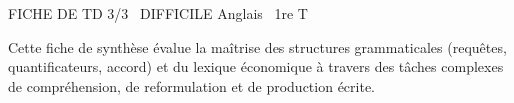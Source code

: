 \documentclass[11pt]{article}
\begin{document}
\begin{tcolorbox}[enhanced,colback=popink,colframe=popink,arc=10pt,boxrule=0pt,left=12pt,right=12pt,top=9pt,bottom=9pt]
{\color{white}\popxbold\small FICHE DE TD 3/3 \textbullet\ DIFFICILE \hfill Anglais \textbullet\ 1re T\par}
\end{tcolorbox}
\vspace{4pt}
Cette fiche de synthèse évalue la maîtrise des structures grammaticales (requêtes, quantificateurs, accord) et du lexique économique à travers des tâches complexes de compréhension, de reformulation et de production écrite.
\end{document}

